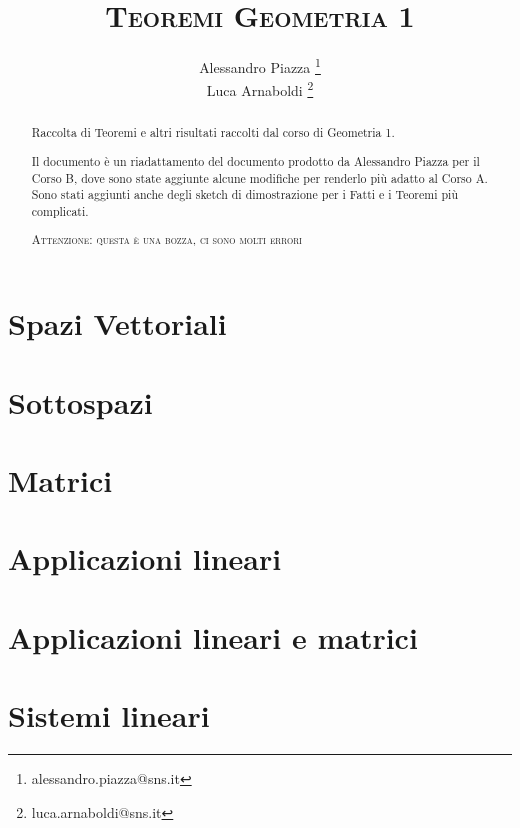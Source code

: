 \documentclass[9pt, a4paper]{article}
\title{\textsc{Teoremi Geometria 1}}
\author{Alessandro Piazza \thanks{alessandro.piazza@sns.it} \\ 
		Luca Arnaboldi \thanks{luca.arnaboldi@sns.it}}
\theoremstyle{mythm}
\begin{document}
\maketitle

\begin{abstract}
	Raccolta di Teoremi e altri risultati raccolti dal corso di Geometria 1.
	
	Il documento è un riadattamento del documento prodotto da Alessandro Piazza per il Corso B, dove sono state aggiunte alcune modifiche per renderlo più adatto al Corso A. 
	Sono stati aggiunti anche degli sketch di dimostrazione per i Fatti e i Teoremi più complicati. 
	\begin{center}
		\textsc{Attenzione: questa è una bozza, ci sono molti errori}
	\end{center}
\end{abstract}

\tableofcontents

\clearpage

\section{Spazi Vettoriali}


\clearpage

\section{Sottospazi}
 

\section{Matrici}


\clearpage

\section{Applicazioni lineari}


\clearpage

\section{Applicazioni lineari e matrici}


\clearpage

\section{Sistemi lineari}

\end{document}
